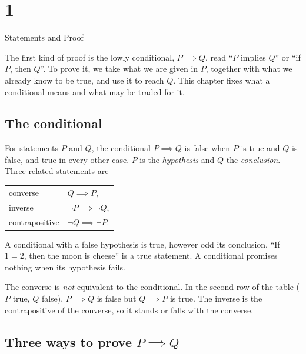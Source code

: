 \chapter{1}{Statements and Proof}

The first kind of proof is the lowly conditional, $P \implies Q$, read
``$P$ implies $Q$'' or ``if $P$, then $Q$''. To prove it, we take what we are
given in $P$, together with what we already know to be true, and use it to
reach $Q$. This chapter fixes what a conditional means and what may be
traded for it.

\section{The conditional}\label{sec:conditional}

\begin{definition}[Conditional]\label{def:conditional}
  For statements $P$ and $Q$, the conditional $P \implies Q$ is false when
  $P$ is true and $Q$ is false, and true in every other case. $P$ is the
  \emph{hypothesis} and $Q$ the \emph{conclusion}. Three related statements
  are
  \begin{center}
    \begin{tabular}{ll}
      converse & $Q \implies P$, \\
      inverse & $\lnot P \implies \lnot Q$, \\
      contrapositive & $\lnot Q \implies \lnot P$.
    \end{tabular}
  \end{center}
\end{definition}

\begin{remark}
  A conditional with a false hypothesis is true, however odd its
  conclusion. ``If $1 = 2$, then the moon is cheese'' is a true statement.
  A conditional promises nothing when its hypothesis fails.
\end{remark}



\begin{remark}
  The converse is \emph{not} equivalent to the conditional. In the second
  row of the table ($P$ true, $Q$ false), $P \implies Q$ is false but
  $Q \implies P$ is true. The inverse is the contrapositive of the converse,
  so it stands or falls with the converse.
\end{remark}

\section{Three ways to prove \texorpdfstring{$P \implies Q$}{P implies Q}}\label{sec:methods}


